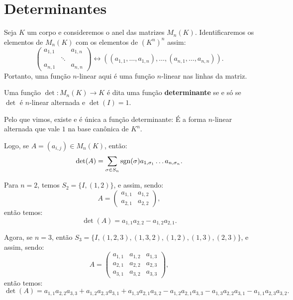 \documentclass[11pt,twoside,a4paper]{book}
\begin{document}
\begin{exemplo}

\end{exemplo}

\section{Determinantes}

Seja $K$ um corpo e consideremos o anel das matrizes $M_n(K)$. Identificaremos os elementos de $M_n(K)$ com os elementos de $(K^n)^n$ assim:
\[
\begin{pmatrix}
a_{1,1}&&a_{1,n}\\&\ddots&\\a_{n,1}&&a_{n,n}
\end{pmatrix} \longleftrightarrow
\left((a_{1,1},\dots,a_{1,n}),\dots,(a_{n,1},\dots,a_{n,n})\right).
\]
Portanto, uma função $n$-linear aqui é uma função $n$-linear nas linhas da matriz.

\begin{definicao}
Uma função $\det:M_n(K)\rightarrow K$ é dita uma função \textbf{determinante} se e só se $\det$ é $n$-linear alternada e $\det(I)=1$.
\end{definicao}

\noindent
Pelo que vimos, existe e é única a função determinante: É a forma $n$-linear alternada que vale $1$ na base canônica de $K^n$.

\medskip
\noindent
Logo, se $A=(a_{i,j})\in M_n(K)$, então:
\[
\det(A)=\sum_{\sigma\in S_n}{\rm sgn}(\sigma)a_{1,\sigma_1}\dots a_{n,\sigma_n}.
\]

\begin{exemplo}
Para $n=2$, temos $S_2=\{I,(1,2)\}$, e assim, sendo:
\[
A=\begin{pmatrix}
a_{1,1}&a_{1,2}\\a_{2,1}&a_{2,2}
\end{pmatrix},
\]
então temos:
\[
\det(A)=a_{1,1}a_{2,2}-a_{1,2}a_{2,1}.
\]
\end{exemplo}

\begin{exemplo}
Agora, se $n=3$, então $S_3=\{I,(1,2,3),(1,3,2),(1,2),(1,3),(2,3)\}$, e assim, sendo:
\[
A=\begin{pmatrix}
a_{1,1}&a_{1,2}&a_{1,3}\\a_{2,1}&a_{2,2}&a_{2,3}\\a_{3,1}&a_{3,2}&a_{3,3}
\end{pmatrix},
\]
então temos:
\[
\det(A)=a_{1,1}a_{2,2}a_{3,3}+a_{1,2}a_{2,3}a_{3,1}+a_{1,3}a_{2,1}a_{3,2}-a_{1,2}a_{2,1}a_{3,3}-a_{1,3}a_{2,2}a_{3,1}-a_{1,1}a_{2,3}a_{3,2}.
\]
\end{exemplo}
\end{document}
